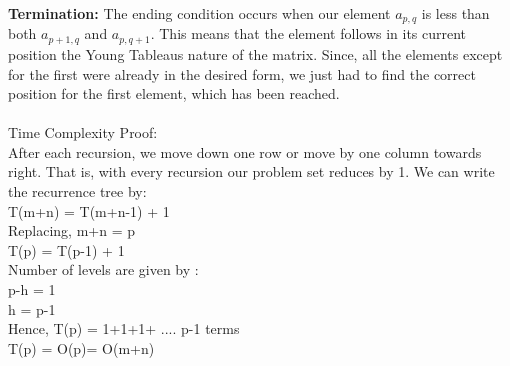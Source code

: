 \documentclass[10pt]{article}
\begin{document}
\textbf{Termination:} The ending condition occurs when our element $a_{p,q}$ is less than both $a_{p+1,q}$ and $a_{p,q+1}$. This means that the element follows in its current position the Young Tableaus nature of the matrix. Since, all the elements except for the first were already in the desired form, we just had to find the correct position for the first element, which has been reached.\\\\
Time Complexity Proof:\\
After each recursion, we move down one row or move by one column towards right. That is, with every recursion our problem set reduces by 1. We can write the recurrence tree by:\\
T(m+n) = T(m+n-1) + 1\\
Replacing, m+n = p\\
T(p) = T(p-1) + 1\\
Number of levels are given by :\\
p-h = 1\\
h = p-1\\
Hence, T(p) = 1+1+1+ .... p-1 terms\\
T(p) = O(p)= O(m+n)\\
\end{document}
